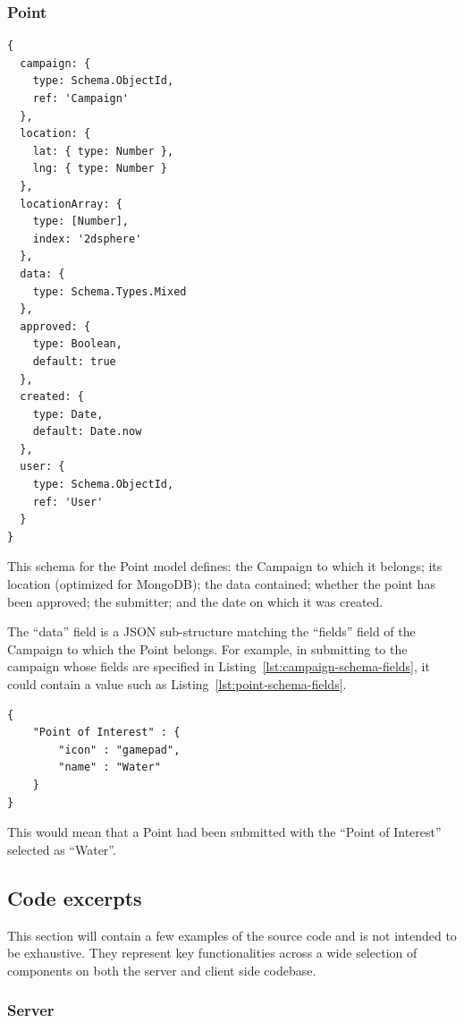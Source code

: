 \documentclass{article}
\begin{document}
		\subsubsection{Point}

		\begin{verbatim}
{
  campaign: {
    type: Schema.ObjectId,
    ref: 'Campaign'
  },
  location: {
    lat: { type: Number },
    lng: { type: Number }
  },
  locationArray: {
    type: [Number],
    index: '2dsphere'
  },
  data: {
    type: Schema.Types.Mixed
  },
  approved: {
    type: Boolean,
    default: true
  },
  created: {
    type: Date,
    default: Date.now
  },
  user: {
    type: Schema.ObjectId,
    ref: 'User'
  }
}
		\end{verbatim}

		This schema for the Point model defines: the Campaign to which it belongs; its location (optimized for MongoDB); the data contained; whether the point has been approved; the submitter; and the date on which it was created.

		The ``data'' field is a JSON sub-structure matching the ``fields'' field of the Campaign to which the Point belongs. For example, in submitting to the campaign whose fields are specified in Listing~\ref{lst:campaign-schema-fields}, it could contain a value such as Listing~\ref{lst:point-schema-fields}.

		\begin{listing}[H]
			\begin{verbatim}
{
    "Point of Interest" : {
        "icon" : "gamepad",
        "name" : "Water"
    }
}
			\end{verbatim}
			\caption{This would mean that a Point had been submitted with the ``Point of Interest'' selected as ``Water''.}
			\label{lst:point-schema-fields}
		\end{listing}

		\subsection{Code excerpts}

		This section will contain a few examples of the source code and is not intended to be exhaustive. They represent key functionalities across a wide selection of components on both the server and client side codebase.

		\subsubsection{Server}
\end{document}
